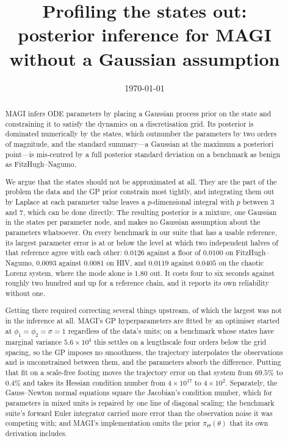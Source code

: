 \documentclass[11pt]{article}
\title{\bfseries Profiling the states out:\\[2pt]
posterior inference for MAGI without a Gaussian assumption}
\author{}
\date{\today}
\theoremstyle{plain}
\theoremstyle{definition}
\theoremstyle{remark}
\begin{document}
\maketitle

\begin{abstract}
\noindent
MAGI \cite{yang2021} infers ODE parameters by placing a Gaussian process prior on the state and
constraining it to satisfy the dynamics on a discretisation grid. Its posterior is dominated
numerically by the states, which outnumber the parameters by two orders of magnitude, and the
standard summary---a Gaussian at the maximum a posteriori point---is mis-centred by a full
posterior standard deviation on a benchmark as benign as FitzHugh--Nagumo.

We argue that the states should not be approximated at all. They are the part of the problem the
data and the GP prior constrain most tightly, and integrating them out by Laplace at each parameter
value leaves a $p$-dimensional integral with $p$ between $3$ and $7$, which can be done directly.
The resulting posterior is a mixture, one Gaussian in the states per parameter node, and makes no
Gaussian assumption about the parameters whatsoever. On every benchmark in our suite that has a usable
reference, its largest parameter error is at or below the level at which two independent halves of
that reference agree with each other: $0.0126$ against a floor of $0.0100$ on FitzHugh--Nagumo,
$0.0093$ against $0.0081$ on HIV, and $0.0119$ against $0.0405$ on the chaotic Lorenz system, where
the mode alone is $1.80$ out. It costs four to six seconds against roughly two hundred and up for
a reference chain, and it reports its own reliability without one.

Getting there required correcting several things upstream, of which the largest was not in the
inference at all. MAGI's GP hyperparameters are fitted by an optimiser started at
$\phi_1 = \phi_2 = \sigma = 1$ regardless of the data's units; on a benchmark whose states have
marginal variance $5.6\times10^4$ this settles on a lengthscale four orders below the grid
spacing, so the GP imposes no smoothness, the trajectory interpolates the observations and is
unconstrained between them, and the parameters absorb the difference. Putting that fit on a
scale-free footing moves the trajectory error on that system from $69.5\%$ to $0.4\%$ and takes its
Hessian condition number from $4\times10^{17}$ to $4\times10^{2}$. Separately, the Gauss--Newton
normal equations square the Jacobian's condition number, which for parameters in mixed units is
repaired by one line of diagonal scaling; the benchmark suite's forward Euler integrator carried
more error than the observation noise it was competing with; and MAGI's implementation omits the
prior $\pi_\Theta(\theta)$ that its own derivation includes.


\end{abstract}
\end{document}
